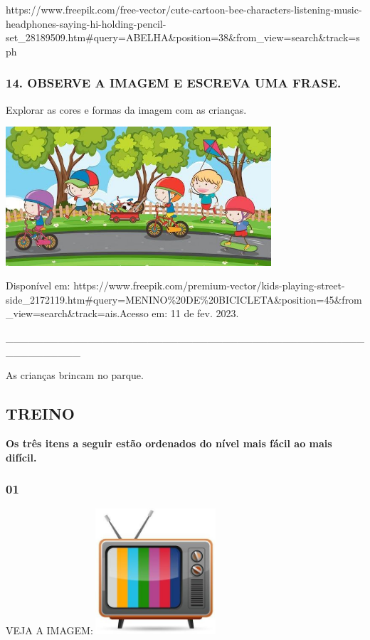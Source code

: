 https://www.freepik.com/free-vector/cute-cartoon-bee-characters-listening-music-headphones-saying-hi-holding-pencil-set\_28189509.htm\#query=ABELHA\&position=38\&from\_view=search\&track=sph

\subsubsection{14. OBSERVE A IMAGEM E ESCREVA UMA
FRASE.}\label{observe-a-imagem-e-escreva-uma-frase.}

Explorar as cores e formas da imagem com as crianças.

\includegraphics[width=3.88542in,height=2.03581in]{media/image122.jpg}

Disponível
em: https://www.freepik.com/premium-vector/kids-playing-street-side\_2172119.htm\#query=MENINO\%20DE\%20BICICLETA\&position=45\&from\_view=search\&track=ais.Acesso em: 11 de fev. 2023.

\_\_\_\_\_\_\_\_\_\_\_\_\_\_\_\_\_\_\_\_\_\_\_\_\_\_\_\_\_\_\_\_\_\_\_\_\_\_\_\_\_\_\_\_\_\_\_\_\_\_\_\_\_\_\_\_\_\_

As crianças brincam no parque.

\subsection{TREINO}\label{treino-1}

\textbf{Os três itens a seguir estão ordenados do nível mais fácil ao mais
difícil. }

\subsubsection{01 }\label{section-4}

VEJA A
IMAGEM:\includegraphics[width=1.82292in,height=1.84306in]{media/image123.jpg}

